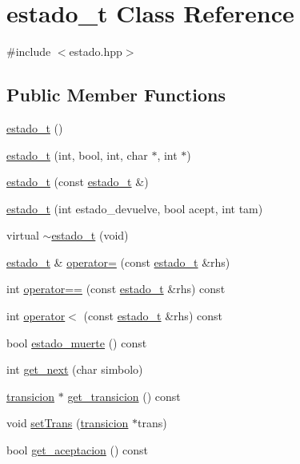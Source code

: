 \hypertarget{classestado__t}{}\section{estado\+\_\+t Class Reference}
\label{classestado__t}


{\ttfamily \#include $<$estado.\+hpp$>$}

\subsection*{Public Member Functions}
\begin{DoxyCompactItemize}
\item 
\hyperlink{classestado__t_a8e45cb6ecaf97bb8e9a33f82151f9323}{estado\+\_\+t} ()
\item 
\hyperlink{classestado__t_ae6fd334fd74a870dff61d310924e0424}{estado\+\_\+t} (int, bool, int, char $\ast$, int $\ast$)
\item 
\hyperlink{classestado__t_ac3dd69d9374264ee0a54868e60773473}{estado\+\_\+t} (const \hyperlink{classestado__t}{estado\+\_\+t} \&)
\item 
\hyperlink{classestado__t_afb5a0d229dfbcadc5ccc4a0ee8d02f3c}{estado\+\_\+t} (int estado\+\_\+devuelve, bool acept, int tam)
\item 
virtual \hyperlink{classestado__t_ab8d1d9470fbf8083b8107ff6c70be4d7}{$\sim$estado\+\_\+t} (void)
\item 
\hyperlink{classestado__t}{estado\+\_\+t} \& \hyperlink{classestado__t_ad7a36a03430853701e4591e05187a14e}{operator=} (const \hyperlink{classestado__t}{estado\+\_\+t} \&rhs)
\item 
int \hyperlink{classestado__t_a5d35ac54bd5ae1378809345816366f23}{operator==} (const \hyperlink{classestado__t}{estado\+\_\+t} \&rhs) const
\item 
int \hyperlink{classestado__t_ae05cc164f6ac82bf50b92a826a120b39}{operator$<$} (const \hyperlink{classestado__t}{estado\+\_\+t} \&rhs) const
\item 
bool \hyperlink{classestado__t_a95a8cfda0f144b54f4b4ad205f25726c}{estado\+\_\+muerte} () const
\item 
int \hyperlink{classestado__t_a0599ddc0084caf5b9c454dcbc2098cb9}{get\+\_\+next} (char simbolo)
\item 
\hyperlink{structtransicion}{transicion} $\ast$ \hyperlink{classestado__t_aff818e6eb56c6d862d0e5fc7ca35d1c7}{get\+\_\+transicion} () const
\item 
void \hyperlink{classestado__t_a3e1a732c3eeb1d678e70bbefd3243a39}{set\+Trans} (\hyperlink{structtransicion}{transicion} $\ast$trans)
\item 
bool \hyperlink{classestado__t_a82629cf1be67ef78156ac248cd57200d}{get\+\_\+aceptacion} () const
\end{DoxyCompactItemize}
